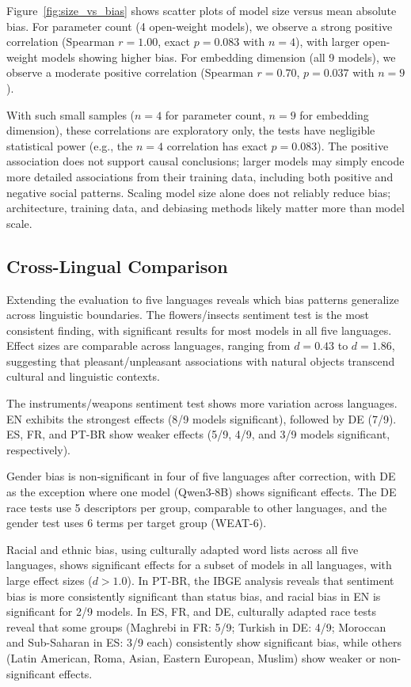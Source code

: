 \documentclass{sbc2019}
\begin{document}
Figure~\ref{fig:size_vs_bias} shows scatter plots of model size versus mean absolute bias. For parameter count (4 open-weight models), we observe a strong positive correlation (Spearman $r = 1.00$, exact $p = 0.083$ with $n=4$), with larger open-weight models showing higher bias. For embedding dimension (all 9 models), we observe a moderate positive correlation (Spearman $r = 0.70$, $p = 0.037$ with $n=9$).

With such small samples ($n = 4$ for parameter count, $n = 9$ for embedding dimension), these correlations are exploratory only, the tests have negligible statistical power (e.g., the $n=4$ correlation has exact $p = 0.083$). The positive association does not support causal conclusions; larger models may simply encode more detailed associations from their training data, including both positive and negative social patterns. Scaling model size alone does not reliably reduce bias; architecture, training data, and debiasing methods likely matter more than model scale.

\subsection{Cross-Lingual Comparison}

Extending the evaluation to five languages reveals which bias patterns generalize across linguistic boundaries. The flowers/insects sentiment test is the most consistent finding, with significant results for most models in all five languages. Effect sizes are comparable across languages, ranging from $d = 0.43$ to $d = 1.86$, suggesting that pleasant/unpleasant associations with natural objects transcend cultural and linguistic contexts.

The instruments/weapons sentiment test shows more variation across languages. EN exhibits the strongest effects (8/9 models significant), followed by DE (7/9). ES, FR, and PT-BR show weaker effects (5/9, 4/9, and 3/9 models significant, respectively).

Gender bias is non-significant in four of five languages after correction, with DE as the exception where one model (Qwen3-8B) shows significant effects. The DE race tests use 5 descriptors per group, comparable to other languages, and the gender test uses 6 terms per target group (WEAT-6).

Racial and ethnic bias, using culturally adapted word lists across all five languages, shows significant effects for a subset of models in all languages, with large effect sizes ($d > 1.0$). In PT-BR, the IBGE analysis reveals that sentiment bias is more consistently significant than status bias, and racial bias in EN is significant for 2/9 models. In ES, FR, and DE, culturally adapted race tests reveal that some groups (Maghrebi in FR: 5/9; Turkish in DE: 4/9; Moroccan and Sub-Saharan in ES: 3/9 each) consistently show significant bias, while others (Latin American, Roma, Asian, Eastern European, Muslim) show weaker or non-significant effects.
\end{document}
